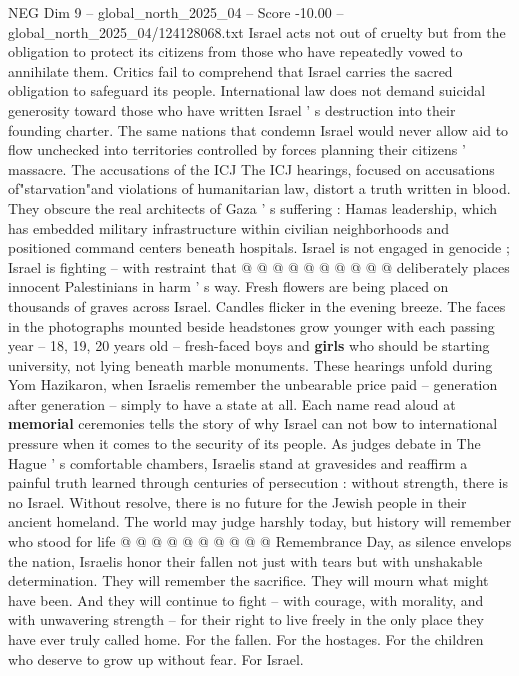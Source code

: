 \begin{textsample}{NEG Dim 9 – global\_north\_2025\_04 – Score -10.00 – global\_north\_2025\_04/124128068.txt}
Israel acts not out of cruelty but from the obligation to protect its citizens from those who have repeatedly vowed to annihilate them.
Critics fail to comprehend that Israel carries the sacred obligation to safeguard its people.
International law does not demand suicidal generosity toward those who have written Israel ' s destruction into their founding charter.
The same nations that condemn Israel would never allow aid to flow unchecked into territories controlled by forces planning their citizens ' massacre.
The accusations of the ICJ The ICJ hearings, focused on accusations of"starvation"and violations of humanitarian law, distort a truth written in blood.
They obscure the real architects of Gaza ' s suffering : Hamas leadership, which has embedded military infrastructure within civilian neighborhoods and positioned command centers beneath hospitals.
Israel is not engaged in genocide ; Israel is fighting -- with restraint that @ @ @ @ @ @ @ @ @ @ deliberately places innocent Palestinians in harm ' s way.
Fresh flowers are being placed on thousands of graves across Israel.
Candles flicker in the evening breeze.
The faces in the photographs mounted beside headstones grow younger with each passing year -- 18, 19, 20 years old -- fresh-faced boys and \textbf{girls} who should be starting university, not lying beneath marble monuments.
These hearings unfold during Yom Hazikaron, when Israelis remember the unbearable price paid -- generation after generation -- simply to have a state at all.
Each name read aloud at \textbf{memorial} ceremonies tells the story of why Israel can not bow to international pressure when it comes to the security of its people.
As judges debate in The Hague ' s comfortable chambers, Israelis stand at gravesides and reaffirm a painful truth learned through centuries of persecution : without strength, there is no Israel.
Without resolve, there is no future for the Jewish people in their ancient homeland.
The world may judge harshly today, but history will remember who stood for life @ @ @ @ @ @ @ @ @ @ Remembrance Day, as silence envelops the nation, Israelis honor their fallen not just with tears but with unshakable determination.
They will remember the sacrifice.
They will mourn what might have been.
And they will continue to fight -- with courage, with morality, and with unwavering strength -- for their right to live freely in the only place they have ever truly called home.
For the fallen.
For the hostages.
For the children who deserve to grow up without fear.
For Israel.

\end{textsample}
